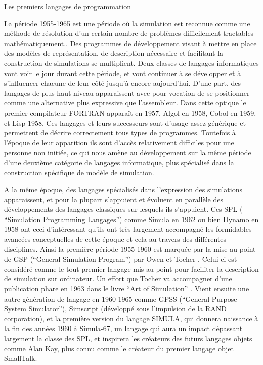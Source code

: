 
\begin{testiv}{Les premiers langages de programmation}{}

La période 1955-1965 est une période où la simulation est reconnue comme une méthode de résolution d'un certain nombre de problèmes difficilement tractables mathématiquement.\autocite{Nance1993, Ackoff1961}. Des programmes de développement visant à mettre en place des modèles de représentation, de description nécessaire et facilitant la construction de simulations se multiplient. Deux classes de langages informatiques vont voir le jour durant cette période, et vont continuer à se développer et à s'influencer chacune de leur côté jusqu'à encore aujourd'hui. D'une part, des langages de plus haut niveau apparaissent avec pour vocation de se positionner comme une alternative plus expressive que l'assembleur. Dans cette optique le premier compilateur FORTRAN apparaît en 1957,  Algol en 1958, Cobol en 1959, et Lisp 1958. Ces langages et leurs successeurs sont d'usage assez générique et permettent de décrire correctement tous types de programmes. Toutefois à l'époque de leur apparition ils sont d'accès relativement difficiles pour une personne non initiée, ce qui nous amène au développement sur la même période d'une deuxième catégorie de langages informatique, plus spécialisé dans la construction spécifique de modèle de simulation. \autocite[239]{Naylor1966}

A la même époque, des langages spécialisés dans l'expression des simulations apparaissent, et pour la plupart s'appuient et évoluent en parallèle des développements des langages classiques sur lesquels ils s'appuient. Ces SPL ( \foreignquote{english}{Simulation Programming Langages}) comme Simula en 1962 ou bien Dynamo en 1958 ont ceci d'intéressant qu'ils ont très largement accompagné les formidables avancées conceptuelles de cette époque et cela au travers des différentes disciplines. Ainsi la première période 1955-1960 est marquée par la mise au point de GSP (\foreignquote{english}{General Simulation Program}) par Owen et Tocher \autocite{Tocher1960}. Celui-ci est considéré comme le tout premier langage mis au point pour faciliter la description de simulation sur ordinateur. Un effort que Tocher va accompagner d'une publication phare en 1963 dans le livre \foreignquote{english}{Art of Simulation} \autocite{Tocher1963} . Vient ensuite une autre génération de langage en 1960-1965 comme GPSS (\foreignquote{english}{General Purpose System Simulator}), Simscript (développé sous l'impulsion de la RAND corporation), et la première version du langage SIMULA, qui donnera naissance à la fin des années 1960 à Simula-67, un langage qui aura un impact dépassant largement la classe des SPL, et inspirera les créateurs des futurs langages objets comme Alan Kay, plus connu comme le créateur du premier langage objet SmallTalk. 


\end{testiv}

